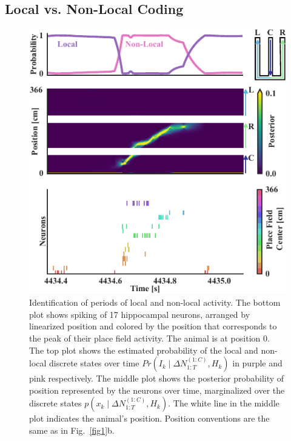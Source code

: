 \documentclass[conference]{IEEEtran}
\begin{document}
\subsection{Local vs. Non-Local Coding}
\begin{figure}[ht]
\centerline{\includegraphics{fig2.pdf}}
\caption{Identification of periods of local and non-local activity. The bottom plot shows spiking of 17 hippocampal neurons, arranged by linearized position and colored by the position that corresponds to the peak of their place field activity. The animal is at position 0. The top plot shows the estimated probability of the local and non-local discrete states over time $Pr(I_{k} \mid \Delta N_{1:T}^{(1:C)}, H_{k})$ in purple and pink respectively. The middle plot shows the posterior probability of position represented by the neurons over time, marginalized over the discrete states $p(x_{k} \mid \Delta N_{1:T}^{(1:C)}, H_{k})$. The white line in the middle plot indicates the animal's position. Position conventions are the same as in Fig.~\ref{fig1}b.}
\label{fig2}
\end{figure}
\end{document}
